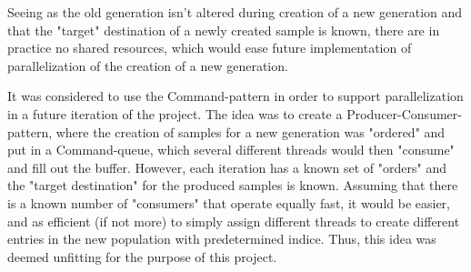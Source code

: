Seeing as the old generation isn't altered during creation of a new generation and that the "target" destination of a newly created sample is known, there are in practice no shared resources, which would ease future implementation of parallelization of the creation of a new generation.

It was considered to use the Command-pattern in order to support parallelization in a future iteration of the project. The idea was to create a Producer-Consumer-pattern, where the creation of samples for a new generation was "ordered" and put in a Command-queue, which several different threads would then "consume" and fill out the buffer. However, each iteration has a known set of "orders" and the "target destination" for the produced samples is known. Assuming that there is a known number of "consumers" that operate equally fast, it would be easier, and as efficient (if not more) to simply assign different threads to create different entries in the new population with predetermined indice. Thus, this idea was deemed unfitting for the purpose of this project.

